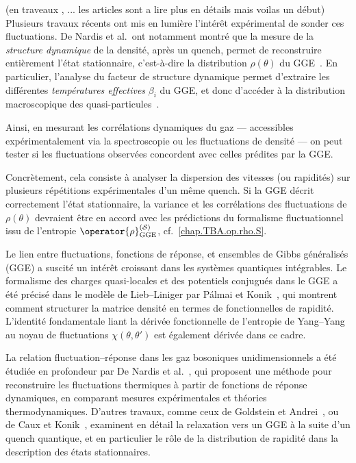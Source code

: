 {\color{blue} { \color{red} (en traveaux , ... les articles sont a lire plus en détails mais voilas un début)} 
\medskip
Plusieurs travaux récents ont mis en lumière l’intérêt expérimental de sonder ces fluctuations. De Nardis et al.\ ont notamment montré que la mesure de la \textit{structure dynamique} de la densité, après un quench, permet de reconstruire entièrement l’état stationnaire, c’est-à-dire la distribution \( \rho(\theta) \) du GGE~\cite{DeNardis2017}. En particulier, l’analyse du facteur de structure dynamique permet d’extraire les différentes \textit{températures effectives} \( \beta_i \) du GGE, et donc d’accéder à la distribution macroscopique des quasi-particules~\cite{Goldstein2013,CauxKonik2012}.

\medskip
Ainsi, en mesurant les corrélations dynamiques du gaz — accessibles expérimentalement via la spectroscopie ou les fluctuations de densité — on peut tester si les fluctuations observées concordent avec celles prédites par la GGE.

\medskip
Concrètement, cela consiste à analyser la dispersion des vitesses (ou rapidités) sur plusieurs répétitions expérimentales d’un même quench. Si la GGE décrit correctement l’état stationnaire, la variance et les corrélations des fluctuations de \( \rho(\theta) \) devraient être en accord avec les prédictions du formalisme fluctuationnel issu de l’entropie \( \operator{\rho}^{(\mathcal{S})}_{\mathrm{GGE}} \), cf.~\eqref{chap.TBA.op.rho.S}.

\medskip
Le lien entre fluctuations, fonctions de réponse, et ensembles de Gibbs généralisés (GGE) a suscité un intérêt croissant dans les systèmes quantiques intégrables. Le formalisme des charges quasi-locales et des potentiels conjugués dans le GGE a été précisé dans le modèle de Lieb–Liniger par Pálmai et Konik~\cite{Palmai2018}, qui montrent comment structurer la matrice densité en termes de fonctionnelles de rapidité. L'identité fondamentale liant la dérivée fonctionnelle de l'entropie de Yang–Yang au noyau de fluctuations $\chi(\theta,\theta')$ est également dérivée dans ce cadre.

La relation fluctuation–réponse dans les gaz bosoniques unidimensionnels a été étudiée en profondeur par De Nardis et al.~\cite{DeNardis2017}, qui proposent une méthode pour reconstruire les fluctuations thermiques à partir de fonctions de réponse dynamiques, en comparant mesures expérimentales et théories thermodynamiques. D'autres travaux, comme ceux de Goldstein et Andrei~\cite{Goldstein2013}, ou de Caux et Konik~\cite{CauxKonik2012}, examinent en détail la relaxation vers un GGE à la suite d’un quench quantique, et en particulier le rôle de la distribution de rapidité dans la description des états stationnaires.

}

